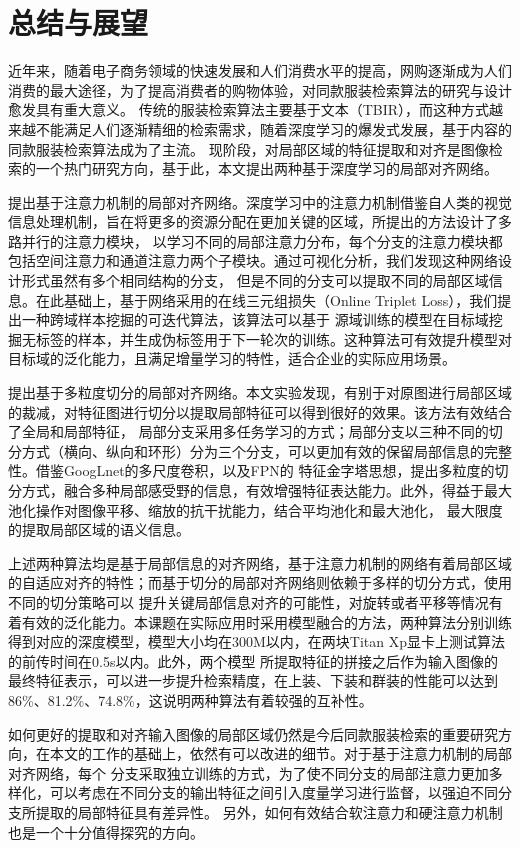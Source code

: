 \chapter{总结与展望}
近年来，随着电子商务领域的快速发展和人们消费水平的提高，网购逐渐成为人们消费的最大途径，为了提高消费者的购物体验，对同款服装检索算法的研究与设计愈发具有重大意义。
传统的服装检索算法主要基于文本（TBIR），而这种方式越来越不能满足人们逐渐精细的检索需求，随着深度学习的爆发式发展，基于内容的同款服装检索算法成为了主流。
现阶段，对局部区域的特征提取和对齐是图像检索的一个热门研究方向，基于此，本文提出两种基于深度学习的局部对齐网络。

提出基于注意力机制的局部对齐网络。深度学习中的注意力机制借鉴自人类的视觉信息处理机制，旨在将更多的资源分配在更加关键的区域，所提出的方法设计了多路并行的注意力模块，
以学习不同的局部注意力分布，每个分支的注意力模块都包括空间注意力和通道注意力两个子模块。通过可视化分析，我们发现这种网络设计形式虽然有多个相同结构的分支，
但是不同的分支可以提取不同的局部区域信息。在此基础上，基于网络采用的在线三元组损失（Online Triplet Loss），我们提出一种跨域样本挖掘的可迭代算法，该算法可以基于
源域训练的模型在目标域挖掘无标签的样本，并生成伪标签用于下一轮次的训练。这种算法可有效提升模型对目标域的泛化能力，且满足增量学习的特性，适合企业的实际应用场景。

提出基于多粒度切分的局部对齐网络。本文实验发现，有别于对原图进行局部区域的裁减，对特征图进行切分以提取局部特征可以得到很好的效果。该方法有效结合了全局和局部特征，
局部分支采用多任务学习的方式；局部分支以三种不同的切分方式（横向、纵向和环形）分为三个分支，可以更加有效的保留局部信息的完整性。借鉴GoogLnet的多尺度卷积，以及FPN的
特征金字塔思想，提出多粒度的切分方式，融合多种局部感受野的信息，有效增强特征表达能力。此外，得益于最大池化操作对图像平移、缩放的抗干扰能力，结合平均池化和最大池化，
最大限度的提取局部区域的语义信息。

上述两种算法均是基于局部信息的对齐网络，基于注意力机制的网络有着局部区域的自适应对齐的特性；而基于切分的局部对齐网络则依赖于多样的切分方式，使用不同的切分策略可以
提升关键局部信息对齐的可能性，对旋转或者平移等情况有着有效的泛化能力。本课题在实际应用时采用模型融合的方法，两种算法分别训练得到对应的深度模型，模型大小均在300M以内，在两块Titan Xp显卡上测试算法的前传时间在0.5s以内。此外，两个模型
所提取特征的拼接之后作为输入图像的最终特征表示，可以进一步提升检索精度，在上装、下装和群装的性能可以达到86\%、81.2\%、74.8\%，这说明两种算法有着较强的互补性。

如何更好的提取和对齐输入图像的局部区域仍然是今后同款服装检索的重要研究方向，在本文的工作的基础上，依然有可以改进的细节。对于基于注意力机制的局部对齐网络，每个
分支采取独立训练的方式，为了使不同分支的局部注意力更加多样化，可以考虑在不同分支的输出特征之间引入度量学习进行监督，以强迫不同分支所提取的局部特征具有差异性。
另外，如何有效结合软注意力和硬注意力机制也是一个十分值得探究的方向。
